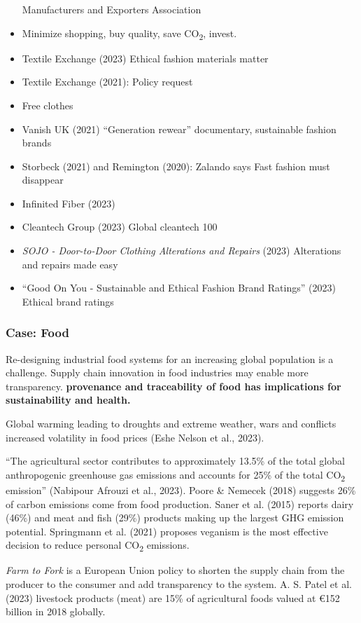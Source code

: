 \documentclass[
  letterpaper,
  DIV=11,
  numbers=noendperiod]{scrartcl}
\begin{document}
\begin{itemize}
  Manufacturers and Exporters Association
\item
  Minimize shopping, buy quality, save CO\textsubscript{2}, invest.
\item
  Textile Exchange (2023) Ethical fashion materials matter
\item
  Textile Exchange (2021): Policy request
\item
  Free clothes
\item
  Vanish UK (2021) ``Generation rewear'' documentary, sustainable
  fashion brands
\item
  Storbeck (2021) and Remington (2020): Zalando says Fast fashion must
  disappear
\item
  Infinited Fiber (2023)
\item
  Cleantech Group (2023) Global cleantech 100
\item
  \emph{{SOJO} - Door-to-Door Clothing Alterations and Repairs} (2023)
  Alterations and repairs made easy
\item
  {``Good {On You} - {Sustainable} and {Ethical Fashion Brand
  Ratings}''} (2023) Ethical brand ratings
\end{itemize}

\subsubsection{Case: Food}\label{case-food}

Re-designing industrial food systems for an increasing global population
is a challenge. Supply chain innovation in food industries may enable
more transparency. \textbf{provenance and traceability of food has
implications for sustainability and health.}

Global warming leading to droughts and extreme weather, wars and
conflicts increased volatility in food prices (Eshe Nelson et al.,
2023).

``The agricultural sector contributes to approximately 13.5\% of the
total global anthropogenic greenhouse gas emissions and accounts for
25\% of the total CO\textsubscript{2} emission'' (Nabipour Afrouzi et
al., 2023). Poore \& Nemecek (2018) suggests 26\% of carbon emissions
come from food production. Saner et al. (2015) reports dairy (46\%) and
meat and fish (29\%) products making up the largest GHG emission
potential. Springmann et al. (2021) proposes veganism is the most
effective decision to reduce personal CO\textsubscript{2} emissions.

\emph{Farm to Fork} is a European Union policy to shorten the supply
chain from the producer to the consumer and add transparency to the
system. A. S. Patel et al. (2023) livestock products (meat) are 15\% of
agricultural foods valued at €152 billion in 2018 globally.
\end{document}
